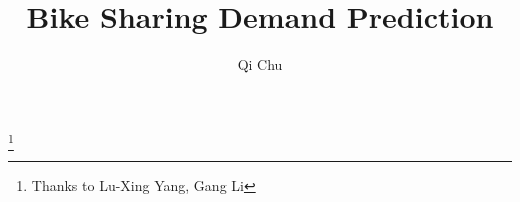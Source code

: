 \documentclass{amsart}
\begin{document}
%
%
\title[Bike Sharing Demand Prediction]{Bike Sharing Demand Prediction}%

\author{Qi Chu}
\address[A.~1]{School of Computer Science,\\ 
Deakin University, Geelong, VIC 3216, Australia}%

\thanks{Thanks to Lu-Xing Yang, Gang Li}
%
\date{\gitAuthorDate}%




\maketitle
\tableofcontents

\newpage



\newpage



\listoftodos
\end{document}
